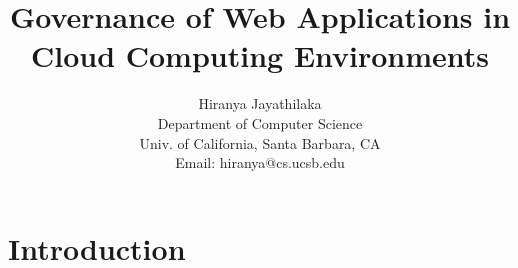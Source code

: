 \documentclass[12pt]{article}
\begin{document}
\date{}

\title{Governance of Web Applications in Cloud Computing Environments}

\author{Hiranya Jayathilaka\\
Department of Computer Science\\
Univ. of California, Santa Barbara, CA\\
Email: hiranya@cs.ucsb.edu
}
\maketitle

\section{Introduction}

\end{document}
